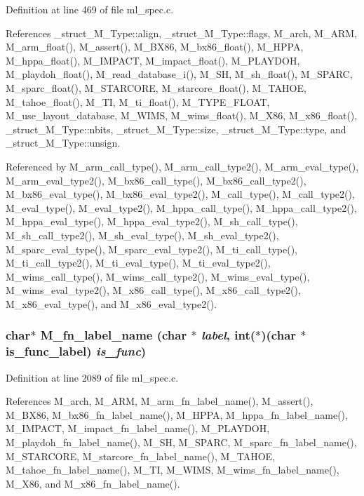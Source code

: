 Definition at line 469 of file ml\_\-spec.c.

References \_\-struct\_\-M\_\-Type::align, \_\-struct\_\-M\_\-Type::flags, M\_\-arch, M\_\-ARM, M\_\-arm\_\-float(), M\_\-assert(), M\_\-BX86, M\_\-bx86\_\-float(), M\_\-HPPA, M\_\-hppa\_\-float(), M\_\-IMPACT, M\_\-impact\_\-float(), M\_\-PLAYDOH, M\_\-playdoh\_\-float(), M\_\-read\_\-database\_\-i(), M\_\-SH, M\_\-sh\_\-float(), M\_\-SPARC, M\_\-sparc\_\-float(), M\_\-STARCORE, M\_\-starcore\_\-float(), M\_\-TAHOE, M\_\-tahoe\_\-float(), M\_\-TI, M\_\-ti\_\-float(), M\_\-TYPE\_\-FLOAT, M\_\-use\_\-layout\_\-database, M\_\-WIMS, M\_\-wims\_\-float(), M\_\-X86, M\_\-x86\_\-float(), \_\-struct\_\-M\_\-Type::nbits, \_\-struct\_\-M\_\-Type::size, \_\-struct\_\-M\_\-Type::type, and \_\-struct\_\-M\_\-Type::unsign.

Referenced by M\_\-arm\_\-call\_\-type(), M\_\-arm\_\-call\_\-type2(), M\_\-arm\_\-eval\_\-type(), M\_\-arm\_\-eval\_\-type2(), M\_\-bx86\_\-call\_\-type(), M\_\-bx86\_\-call\_\-type2(), M\_\-bx86\_\-eval\_\-type(), M\_\-bx86\_\-eval\_\-type2(), M\_\-call\_\-type(), M\_\-call\_\-type2(), M\_\-eval\_\-type(), M\_\-eval\_\-type2(), M\_\-hppa\_\-call\_\-type(), M\_\-hppa\_\-call\_\-type2(), M\_\-hppa\_\-eval\_\-type(), M\_\-hppa\_\-eval\_\-type2(), M\_\-sh\_\-call\_\-type(), M\_\-sh\_\-call\_\-type2(), M\_\-sh\_\-eval\_\-type(), M\_\-sh\_\-eval\_\-type2(), M\_\-sparc\_\-eval\_\-type(), M\_\-sparc\_\-eval\_\-type2(), M\_\-ti\_\-call\_\-type(), M\_\-ti\_\-call\_\-type2(), M\_\-ti\_\-eval\_\-type(), M\_\-ti\_\-eval\_\-type2(), M\_\-wims\_\-call\_\-type(), M\_\-wims\_\-call\_\-type2(), M\_\-wims\_\-eval\_\-type(), M\_\-wims\_\-eval\_\-type2(), M\_\-x86\_\-call\_\-type(), M\_\-x86\_\-call\_\-type2(), M\_\-x86\_\-eval\_\-type(), and M\_\-x86\_\-eval\_\-type2().
\subsubsection{\setlength{\rightskip}{0pt plus 5cm}char$\ast$ M\_\-fn\_\-label\_\-name (char $\ast$ {\em label}, int($\ast$)(char $\ast$is\_\-func\_\-label) {\em is\_\-func})}\label{m__spec_8h_c708ff0d2cfb43dabe959a6b8851488d}




Definition at line 2089 of file ml\_\-spec.c.

References M\_\-arch, M\_\-ARM, M\_\-arm\_\-fn\_\-label\_\-name(), M\_\-assert(), M\_\-BX86, M\_\-bx86\_\-fn\_\-label\_\-name(), M\_\-HPPA, M\_\-hppa\_\-fn\_\-label\_\-name(), M\_\-IMPACT, M\_\-impact\_\-fn\_\-label\_\-name(), M\_\-PLAYDOH, M\_\-playdoh\_\-fn\_\-label\_\-name(), M\_\-SH, M\_\-SPARC, M\_\-sparc\_\-fn\_\-label\_\-name(), M\_\-STARCORE, M\_\-starcore\_\-fn\_\-label\_\-name(), M\_\-TAHOE, M\_\-tahoe\_\-fn\_\-label\_\-name(), M\_\-TI, M\_\-WIMS, M\_\-wims\_\-fn\_\-label\_\-name(), M\_\-X86, and M\_\-x86\_\-fn\_\-label\_\-name().
